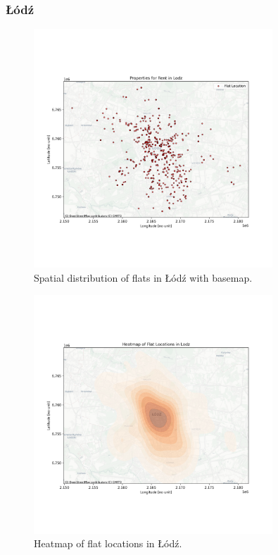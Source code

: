     \subsubsection{Łódź}
    \begin{figure}[H]
        \centering
        \includegraphics[width=0.8\textwidth]{figures/lodz_flats_map_with_basemap.png}
        \caption{Spatial distribution of flats in Łódź with basemap.}
        \label{fig:lodz_basemap}
    \end{figure}

    \begin{figure}[H]
        \centering
        \includegraphics[width=0.8\textwidth]{figures/lodz_heatmap.png}
        \caption{Heatmap of flat locations in Łódź.}
        \label{fig:lodz_heatmap}
    \end{figure}

